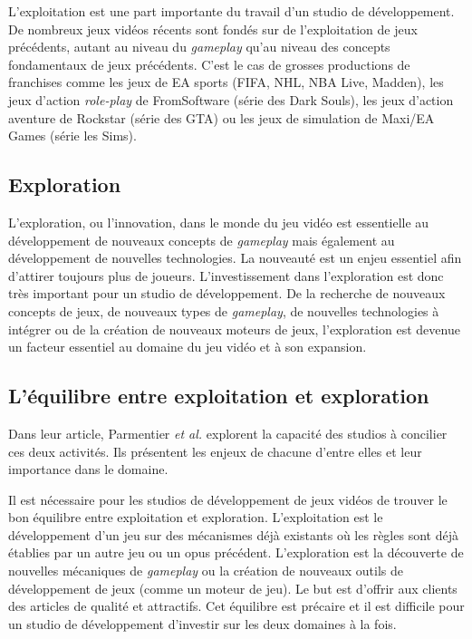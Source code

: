 L'exploitation est une part importante du travail d'un studio de développement. De nombreux jeux vidéos récents sont fondés sur de l'exploitation de jeux précédents, autant au niveau du \emph{gameplay} qu'au niveau des concepts fondamentaux de jeux précédents. C'est le cas de grosses productions de franchises comme les jeux de EA sports (FIFA, NHL, NBA Live, Madden), les jeux d'action \emph{role-play} de FromSoftware (série des Dark Souls), les jeux d'action aventure de Rockstar (série des GTA) ou les jeux de simulation de Maxi/EA Games (série les Sims). 

\subsection{Exploration}
L'exploration, ou l'innovation, dans le monde du jeu vidéo est essentielle au développement de nouveaux concepts de \emph{gameplay} mais également au développement de nouvelles technologies. La nouveauté est un enjeu essentiel afin d'attirer toujours plus de joueurs. L'investissement dans l'exploration est donc très important pour un studio de développement. De la recherche de nouveaux concepts de jeux, de nouveaux types de \emph{gameplay}, de nouvelles technologies à intégrer ou de la création de nouveaux moteurs de jeux, l'exploration est devenue un facteur essentiel au domaine du jeu vidéo et à son expansion.


\subsection{L'équilibre entre exploitation et exploration}
Dans leur article, Parmentier \emph{et al.} \cite{ParmentierGuy2009Iecd} explorent la capacité des studios à concilier ces deux activités. Ils présentent les enjeux de chacune d'entre elles et leur importance dans le domaine.

Il est nécessaire pour les studios de développement de jeux vidéos de trouver le bon équilibre entre exploitation et exploration. L'exploitation est le développement d'un jeu sur des mécanismes déjà existants où les règles sont déjà établies par un autre jeu ou un opus précédent. L'exploration est la découverte de nouvelles mécaniques de \emph{gameplay} ou la création de nouveaux outils de développement de jeux (comme un moteur de jeu). Le but est d'offrir aux clients des articles de qualité et attractifs. Cet équilibre est précaire et il est difficile pour un studio de développement d'investir sur les deux domaines à la fois. 



